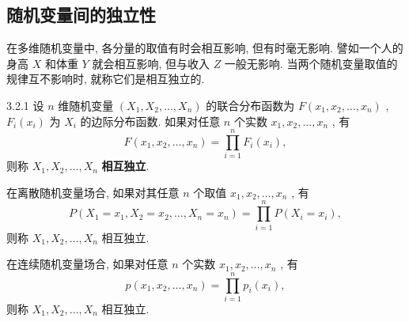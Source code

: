    \subsection{随机变量间的独立性}\label{ssec:3.2.4}
   在多维随机变量中, 各分量的取值有时会相互影响, 但有时毫无影响. 譬如一个人的身高 $X$ 和体重 $Y$ 就会相互影响, 但与收入 $Z$ 一般无影响. 当两个随机变量取值的规律互不影响时, 就称它们是相互独立的.
   \begin{definition}{}{3.2.1}
   	设 $n$ 维随机变量 $(X_1,X_2,\ldots,X_n)$ 的联合分布函数为 $F(x_1,x_2,\ldots,x_n)$ , $F_i(x_i)$ 为 $X_i$ 的边际分布函数. 如果对任意 $n$ 个实数 $x_1,x_2,\ldots,x_n$ , 有
   	\begin{equation}\label{eq:3.2.7}
   		F(x_1,x_2,\ldots,x_n)=\prod_{i=1}^{n}F_i(x_i),
   	\end{equation}
   	则称 $X_1,X_2,\ldots,X_n$ \textbf{相互独立}.
   \end{definition}
   在离散随机变量场合, 如果对其任意 $n$ 个取值 $x_1,x_2,\ldots,x_n$ , 有
   \begin{equation}\label{eq:3.2.8}
   	P(X_1=x_1,X_2=x_2,\ldots,X_n=x_n)=\prod_{i=1}^{n}P(X_i=x_i),
   \end{equation}
   则称 $X_1,X_2,\ldots,X_n$ 相互独立.
   
   在连续随机变量场合, 如果对任意 $n$ 个实数 $x_1,x_2,\ldots,x_n$ , 有
   \begin{equation}\label{eq:3.2.9}
   	p(x_1,x_2,\ldots,x_n)=\prod_{i=1}^{n}p_i(x_i),
   \end{equation}
   则称 $X_1,X_2,\ldots,X_n$ 相互独立.
   
